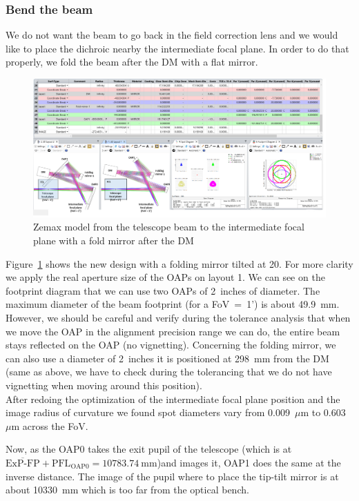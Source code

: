 \documentclass[12pt,a4paper]{article}
\begin{document}
\subsubsection{Bend the beam}
We do not want the beam to go back in the field correction lens and we would like to place the dichroic nearby the intermediate focal plane. In order to do that properly, we fold the beam after the DM with a flat mirror.
\begin{figure}[H]
	\begin{center}
		\includegraphics[width=\textwidth]{images/FP_2_intFP_FoldMirror.PNG}
		\caption{Zemax model from the telescope beam to the intermediate focal plane with a fold mirror after the DM}\label{fig:FP_2_intFP_FoldMirror}
	\end{center}
\end{figure}
Figure~\ref{fig:FP_2_intFP_FoldMirror} shows the new design with a folding mirror tilted at 20\degree. For more clarity we apply the real aperture size of the OAPs on layout 1. We can see on the footprint diagram that we can use two OAPs of 2~inches of diameter. The maximum diameter of the beam footprint (for a FoV~=~1') is about 49.9~mm. However, we should be careful and verify during the tolerance analysis that when we move the OAP in the alignment precision range we can do, the entire beam stays reflected on the OAP (no vignetting). Concerning the folding mirror, we can also use a diameter of 2~inches it is positioned at 298~mm from the DM (same as above, we have to check during the tolerancing that we do not have vignetting when moving around this position).\\

After redoing the optimization of the intermediate focal plane position and the image radius of curvature we found spot diameters vary from 0.009~$\mu$m to 0.603~$\mu$m across the FoV.




Now, as the OAP0 takes the exit pupil of the telescope (which is at  $\overline{\text{ExP-FP}}+\text{PFL}_{\text{OAP0}} = 10783.74~\text{mm}$)and images it, OAP1 does the same at the inverse distance. The image of the pupil where to place the tip-tilt mirror is at about 10330~mm which is too far from the optical bench. 
\end{document}
